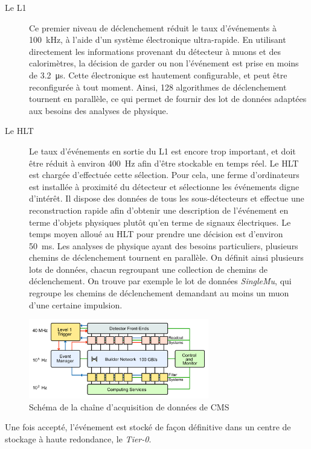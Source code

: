 \begin{description}
  \item[Le L1] Ce premier niveau de déclenchement réduit le taux d’événements à \SI{100}{\kHz}, à l'aide d'un système électronique ultra-rapide. En utilisant directement les informations provenant du détecteur à muons et des calorimètres, la décision de garder ou non l'événement est prise en moins de \SI{3.2}{\us}. Cette électronique est hautement configurable, et peut être reconfigurée à tout moment. Ainsi, 128 algorithmes de déclenchement tournent en parallèle, ce qui permet de fournir des lot de données adaptées aux besoins des analyses de physique.
  \item[Le HLT] Le taux d'événements en sortie du L1 est encore trop important, et doit être réduit à environ \SI{400}{\Hz} afin d'être stockable en temps réel. Le HLT est chargée d'effectuée cette sélection. Pour cela, une ferme d'ordinateurs est installée à proximité du détecteur et sélectionne les événements digne d’intérêt. Il dispose des données de tous les sous-détecteurs et effectue une reconstruction rapide afin d'obtenir une description de l'événement en terme d'objets physiques plutôt qu'en terme de signaux électriques. Le temps moyen alloué au HLT pour prendre une décision est d'environ \SI{50}{\ms}. Les analyses de physique ayant des besoins particuliers, plusieurs chemins de déclenchement tournent en parallèle. On définit ainsi plusieurs lots de données, chacun regroupant une collection de chemins de déclenchement. On trouve par exemple le lot de données \emph{SingleMu}, qui regroupe les chemins de déclenchement demandant au moins un muon d'une certaine impulsion.
\end{description}

\begin{figure}[tb] \centering
  \includegraphics[width=0.7\textwidth]{chapitre2/figs/DAQ.pdf}
  \caption{Schéma de la chaîne d'acquisition de données de CMS}
  \label{fig:daq}
\end{figure}

Une fois accepté, l'événement est stocké de façon définitive dans un centre de stockage à haute redondance, le \emph{Tier-0}.

